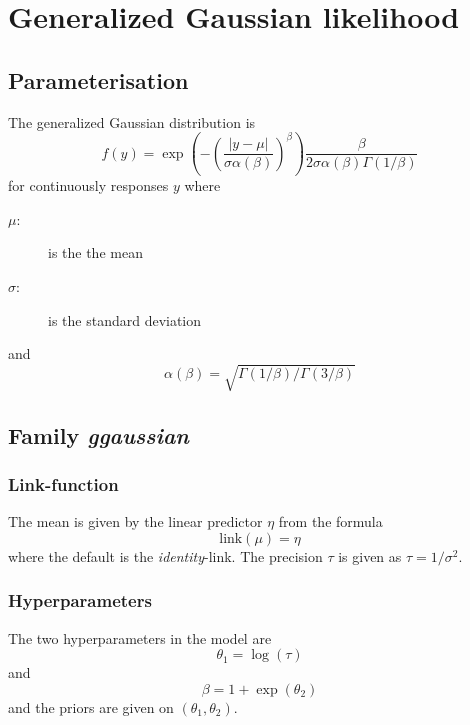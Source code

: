 \documentclass[a4paper,11pt]{article}
\begin{document}
\section*{Generalized Gaussian likelihood}

\subsection*{Parameterisation}

The generalized Gaussian distribution is
\begin{displaymath}
    f(y) = \exp\left( - \left( \frac{|y-\mu|}{\sigma\alpha(\beta)}\right)^{\beta}\right)
    \frac{\beta}{2\sigma\alpha(\beta) \Gamma(1/\beta)}
\end{displaymath}
for continuously responses $y$ where
\begin{description}
\item[$\mu$:] is the the mean
\item[$\sigma$:] is the standard deviation
\end{description}
and
\begin{displaymath}
    \alpha(\beta) = \sqrt{\Gamma(1/\beta)/\Gamma(3/\beta)}
\end{displaymath}

\subsection*{Family \emph{ggaussian}}
\subsubsection*{Link-function}

The mean is given by the linear predictor $\eta$ from the formula
\begin{displaymath}
    \text{link}(\mu) = \eta
\end{displaymath}
where the default is the \emph{identity}-link. The precision $\tau$ is given
as $\tau = 1/\sigma^{2}$.

\subsubsection*{Hyperparameters}
The two hyperparameters in the model are
\begin{displaymath}
    \theta_1=\log(\tau)
\end{displaymath}
and
\begin{displaymath}
    \beta = 1 + \exp(\theta_2)
\end{displaymath}
and the priors are given on $(\theta_1, \theta_2)$.
\end{document}
